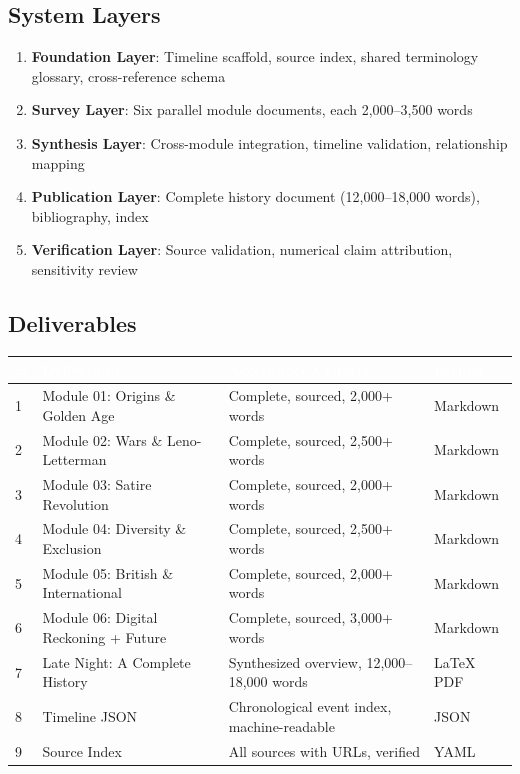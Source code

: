 \documentclass[11pt,letterpaper]{article}
\newcommand{\tableheader}[1]{\textbf{\sffamily\textcolor{white}{#1}}}
\begin{document}
\subsection{System Layers}

\begin{enumerate}[leftmargin=1.5em]
  \item \textbf{Foundation Layer}: Timeline scaffold, source index, shared terminology glossary, cross-reference schema
  \item \textbf{Survey Layer}: Six parallel module documents, each 2,000--3,500 words
  \item \textbf{Synthesis Layer}: Cross-module integration, timeline validation, relationship mapping
  \item \textbf{Publication Layer}: Complete history document (12,000--18,000 words), bibliography, index
  \item \textbf{Verification Layer}: Source validation, numerical claim attribution, sensitivity review
\end{enumerate}

\subsection{Deliverables}

\begin{center}
\begin{tabularx}{\textwidth}{C{0.5cm}L{3.5cm}XC{2cm}}
\toprule
{}
\tableheader{\#} & \tableheader{Deliverable} & \tableheader{Acceptance Criteria} & \tableheader{Format} \\
 & Module 01: Origins \& Golden Age & Complete, sourced, 2,000+ words & Markdown \\
2 & Module 02: Wars \& Leno-Letterman & Complete, sourced, 2,500+ words & Markdown \\
3 & Module 03: Satire Revolution & Complete, sourced, 2,000+ words & Markdown \\
4 & Module 04: Diversity \& Exclusion & Complete, sourced, 2,500+ words & Markdown \\
5 & Module 05: British \& International & Complete, sourced, 2,000+ words & Markdown \\
6 & Module 06: Digital Reckoning + Future & Complete, sourced, 3,000+ words & Markdown \\
7 & Late Night: A Complete History & Synthesized overview, 12,000--18,000 words & LaTeX PDF \\
8 & Timeline JSON & Chronological event index, machine-readable & JSON \\
9 & Source Index & All sources with URLs, verified & YAML \\
\bottomrule
\end{tabularx}
\end{center}
\end{document}
